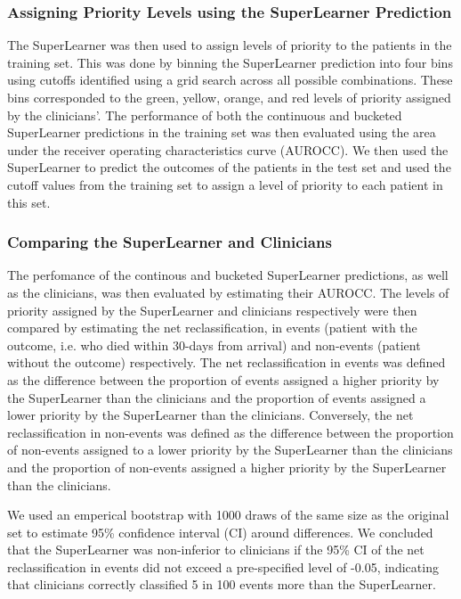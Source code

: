\documentclass[10pt,letterpaper]{article}\usepackage[]{graphicx}\usepackage[]{color}
\begin{document}
\subsubsection*{Assigning Priority Levels using the SuperLearner Prediction}
The SuperLearner was then used to assign levels of priority to the patients in
the training set. This was done by binning the SuperLearner prediction into four
bins using cutoffs identified using a grid search across all possible
combinations. These bins corresponded to the green, yellow, orange, and red
levels of priority assigned by the clinicians'. The performance of both the
continuous and bucketed SuperLearner predictions in the training set was then
evaluated using the area under the receiver operating characteristics curve
(AUROCC). We then used the SuperLearner to predict the outcomes of the patients
in the test set and used the cutoff values from the training set to assign a
level of priority to each patient in this set.

\subsubsection*{Comparing the SuperLearner and Clinicians}
The perfomance of the continous and bucketed SuperLearner predictions, as well
as the clinicians, was then evaluated by estimating their AUROCC. The levels of
priority assigned by the SuperLearner and clinicians respectively were then
compared by estimating the net reclassification, in events (patient with the
outcome, i.e. who died within 30-days from arrival) and non-events (patient
without the outcome) respectively. The net reclassification in events was
defined as the difference between the proportion of events assigned a higher
priority by the SuperLearner than the clinicians and the proportion of events
assigned a lower priority by the SuperLearner than the clinicians. Conversely,
the net reclassification in non-events was defined as the difference between the
proportion of non-events assigned to a lower priority by the SuperLearner than
the clinicians and the proportion of non-events assigned a higher priority by
the SuperLearner than the clinicians.

We used an emperical bootstrap with 1000 draws of the same size as the original
set to estimate 95\% confidence interval (CI) around differences. We concluded
that the SuperLearner was non-inferior to clinicians if the 95\% CI of the net
reclassification in events did not exceed a pre-specified level of -0.05,
indicating that clinicians correctly classified 5 in 100 events more than the
SuperLearner.
\end{document}
